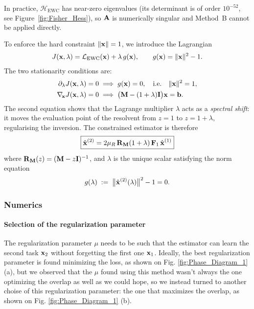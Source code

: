 \documentclass[11pt]{article}
\begin{document}
\begin{rem}
In practice, $\mathcal{H}_{\mathrm{EWC}}$ has near-zero eigenvalues
(its determinant is of order $10^{-52}$, see Figure~\ref{fig:Fisher_Hess}),
so $\boldsymbol{\mathbf{A}}$ is numerically singular and Method~B cannot be applied
directly.

To enforce the hard constraint $\|\boldsymbol{\mathbf{x}}\|=1$, we introduce the
Lagrangian
\[
    J(\boldsymbol{\mathbf{x}},\lambda)
    = \mathcal{L}_{\mathrm{EWC}}(\boldsymbol{\mathbf{x}})
    + \lambda\,g(\boldsymbol{\mathbf{x}}), \qquad
    g(\boldsymbol{\mathbf{x}}) = \|\boldsymbol{\mathbf{x}}\|^2 - 1.
\]
The two stationarity conditions are:
\begin{align}
    \partial_\lambda J(\boldsymbol{\mathbf{x}},\lambda) = 0
        &\;\Longrightarrow\; g(\boldsymbol{\mathbf{x}}) = 0,
        \quad\text{i.e.}\quad \|\boldsymbol{\mathbf{x}}\|^2 = 1, \\
    \nabla_{\!\boldsymbol{\mathbf{x}}} J(\boldsymbol{\mathbf{x}},\lambda) = 0
        &\;\Longrightarrow\;
        \bigl(\boldsymbol{\mathbf{M}} - (1+\lambda)\boldsymbol{\mathbf{I}}\bigr)\boldsymbol{\mathbf{x}} = \boldsymbol{\mathbf{b}}.
\end{align}
The second equation shows that the Lagrange multiplier $\lambda$ acts as a
\emph{spectral shift}: it moves the evaluation point of the resolvent from
$z=1$ to $z = 1+\lambda$, regularising the inversion.  The constrained
estimator is therefore
\begin{equation}
    \boxed{
      \hat{\boldsymbol{\mathbf{x}}}^{(2)}
      = 2\mu_R\,\boldsymbol{\mathbf{R}}_{\boldsymbol{\mathbf{M}}}(1+\lambda)\,
        \boldsymbol{\mathbf{F}}_1\,\hat{\boldsymbol{\mathbf{x}}}^{(1)}
    }
    \label{eq:final_estimator_lagrange}
\end{equation}
where $\boldsymbol{\mathbf{R}}_{\boldsymbol{\mathbf{M}}}(z) = (\boldsymbol{\mathbf{M}} - z\boldsymbol{\mathbf{I}})^{-1}$, and
$\lambda$ is the unique scalar satisfying the norm equation
\begin{equation}
    g(\lambda) \;:=\; \bigl\|\hat{\boldsymbol{\mathbf{x}}}^{(2)}(\lambda)\bigr\|^2 - 1 = 0.
    \label{eq:norm_constraint}
\end{equation}





\subsubsection{Numerics}
\paragraph{Selection of the regularization parameter}
The regularization parameter  $\mu$ needs to be such that the estimator can learn the second task $\boldsymbol{\mathbf{x}}_2$ without forgetting the first one $\boldsymbol{\mathbf{x}}_1$. Ideally, the best regularization parameter is found minimizing the loss, as shown on Fig. \ref{fig:Phase_Diagram_1} (a), but we observed that the $\mu$ found using this method wasn't always the one optimizing the overlap as well as we could hope, so we instead turned to another choise of this regularization parameter: the one that maximizes the overlap, as shown on Fig. \ref{fig:Phase_Diagram_1} (b).


\end{rem}
\end{document}
